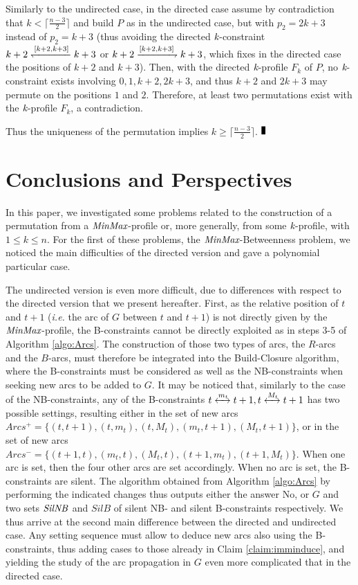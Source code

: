 \documentclass{article}
\newcommand{\M}{\mbox{\it MinMax}}
\newcommand{\kM}{\mbox{\it k}}
\newcommand{\lrf}[1]{\xleftrightarrow{#1}}
\newcommand{\rf}[1]{\xrightharpoondown{#1}}
\newcommand{\lf}[1]{\xleftharpoondown{#1}}
\newcommand{\Sil}{{\it SilNB}}
\renewcommand{\Box}{\rule{1.5mm}{3mm}}
\begin{document}
 Similarly to the undirected case, in the directed case assume by contradiction that 
$k<\lceil \frac{n-3}{2}\rceil$ and build $P$ as in the
undirected case, but with $p_2=2k+3$ instead of $p_2=k+3$ (thus avoiding  the directed
$\kM$-constraint $k+2\lf{[k+2,k+3]}k+3$ or  $k+2\rf{[k+2,k+3]}k+3$, which fixes in the directed case
the positions of  $k+2$ and $k+3$). 
Then, with the directed $\kM$-profile $F_k$ of $P$, no $\kM$-constraint exists involving $0, 1, k+2, 2k+3$, 
and thus $k+2$ and $2k+3$ may permute on the positions $1$ and $2$. Therefore, at least two permutations exist
with the $\kM$-profile $F_k$, a contradiction.

Thus the uniqueness of the permutation implies $k\geq \lceil \frac{n-3}{2}\rceil$. 
$\Box$


\section{Conclusions and Perspectives}\label{sect:Conclusion}

In this paper, we investigated some problems related to the construction of
a permutation from a $\M$-profile or, more generally, from some $\kM$-profile,
with $1\leq k\leq n$. For the first of these problems, the $\M$-{\sc Betweenness} problem,
we noticed the main difficulties of the directed version and gave a polynomial particular case.

The undirected version is even more difficult, due to differences with respect to the
directed version that we  present hereafter. First, as the relative position of $t$ and $t+1$
({\em i.e.} the arc of $G$ between $t$ and $t+1$) is not directly given by the 
$\M$-profile, the B-constraints cannot be directly exploited as in steps 3-5 of 
Algorithm \ref{algo:Arcs}. The construction of those two types of arcs, the $R$-arcs and
the $B$-arcs, must therefore be integrated into the Build-Closure algorithm, 
where the B-constraints must be considered as well as the NB-constraints when seeking  
new arcs to be added to $G$. It may be noticed that, similarly to the case of the NB-constraints,  
any of the B-constraints $t\lrf{m_t}t+1, t\lrf{M_t} t+1$ has two possible settings, resulting either in the  
set of new  arcs 
$Arcs^+=\{(t,t+1), (t,m_t), (t,M_t), (m_t,t+1), (M_t,t+1)\}$, or in the set of new arcs
$Arcs^-=\{(t+1,t), (m_t,t), (M_t,t), (t+1, m_t), (t+1,M_t)\}$. When one arc is set, then
the four other arcs are set accordingly. When no arc is set, the B-constraints are silent.
The algorithm obtained from Algorithm \ref{algo:Arcs} by performing the indicated changes
thus outputs either the answer No, or $G$ and two  sets $\Sil$ and $SilB$ of
silent NB- and silent B-constraints respectively.
We thus arrive at the second main difference between the directed and undirected case. 
Any setting sequence must allow to deduce new arcs also using the B-constraints, 
thus adding  cases to those already in Claim \ref{claim:imminduce}, and yielding the
study of the arc propagation in $G$ even more complicated that in the directed case.
\end{document}
